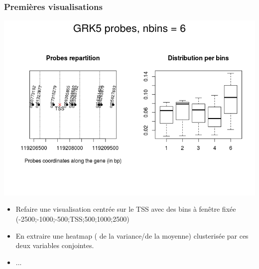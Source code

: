 \documentclass{beamer}
\begin{document}
\begin{frame}
\frametitle{Premières visualisations}
\includegraphics[width=\textwidth]{GRK5_binplot.png}
\end{frame}

\begin{frame}
\begin{itemize}
\item Refaire une visualisation centrée sur le TSS avec des bins à fenêtre fixée (-2500;-1000;-500;TSS;500;1000;2500)
\item En extraire une heatmap ( de la variance/de la moyenne) clusterisée par ces deux variables conjointes.
\item ...
\end{itemize}
\end{frame}
\end{document}

